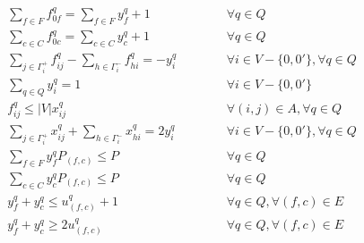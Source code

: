 \documentclass[12pt]{article}
\begin{document}
\begin{eqnarray}
\label{eq01}
  \sum\limits_{f \in F} {f^q_{0f}} = \sum\limits_{f \in F} {y^q_f} + 1 & \hspace{1cm} & \forall q \in Q \\
\label{eq02}
  \sum\limits_{c \in C} {f^q_{0c}} = \sum\limits_{c \in C} {y^q_c} + 1 & \hspace{1cm} & \forall q \in Q \\
\label{eq03}
  \sum\limits_{j \in \Gamma^+_i} {f^q_{ij}} - \sum\limits_{h \in \Gamma^-_i}{f^q_{hi}} = -y^q_i & \hspace{1cm} & \forall i \in V - \{0,0'\}, \forall q \in Q \\
\label{eq04}
  \sum\limits_{q \in Q} {y^q_i} = 1 & \hspace{1cm} & \forall i \in V - \{0,0'\} \\
\label{eq05}
  f^q_{ij} \le |V| x^q_{ij} & \hspace{1cm} & \forall (i,j) \in A, \forall q \in Q \\
\label{eq06}
  \sum\limits_{j \in \Gamma^+_i}{x^q_{ij}} + \sum\limits_{h \in \Gamma^-_i}{x^q_{hi}} = 2y^q_i & \hspace{1cm} & \forall i \in V - \{0,0'\}, \forall q \in Q \\
\label{eq07}
  \sum\limits_{f \in F} {y^{q}_f P_{(f,c)}} \le P & \hspace{1cm} & \forall q \in Q \\
\label{eq08}
  \sum\limits_{c \in C} {y^{q}_c P_{(f,c)}} \le P & \hspace{1cm} & \forall q \in Q \\
\label{eq09}
  y^{q}_f + y^{q}_c \le u^q_{(f,c)} + 1 & \hspace{1cm} & \forall q \in Q, \forall (f,c) \in E \\
\label{eq10}
  y^{q}_f + y^{q}_c \ge 2u^q_{(f,c)} & \hspace{1cm} & \forall q \in Q, \forall (f,c) \in E 
\end{eqnarray}
\end{document}

